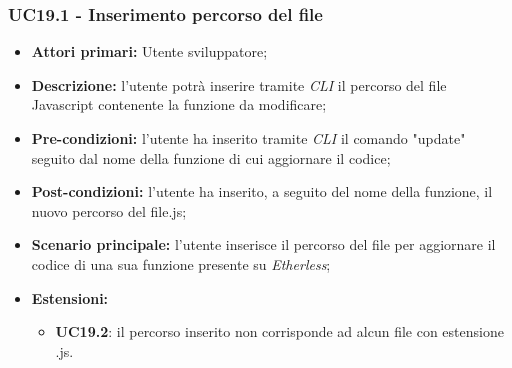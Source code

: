 \subsubsection{UC19.1 - Inserimento percorso del file}
\begin{itemize}
	\item \textbf{Attori primari:} Utente sviluppatore;
	\item \textbf{Descrizione:} l'utente potrà inserire tramite \textit{CLI\glo} il percorso del file Javascript contenente la funzione da modificare; 
	\item \textbf{Pre-condizioni:} l'utente ha inserito tramite \textit{CLI\glo} il comando "update" seguito dal nome della funzione di cui aggiornare il codice;
	\item \textbf{Post-condizioni:} l'utente ha inserito, a seguito del nome della funzione, il nuovo percorso del file.js;
	\item \textbf{Scenario principale:} l'utente inserisce il percorso del file per aggiornare il codice di una sua funzione presente su \textit{Etherless};
	\item \textbf{Estensioni:} 
	\begin{itemize}
		\item \textbf{UC19.2}: il percorso inserito non corrisponde ad alcun file con estensione .js.
	\end{itemize}
\end{itemize}
